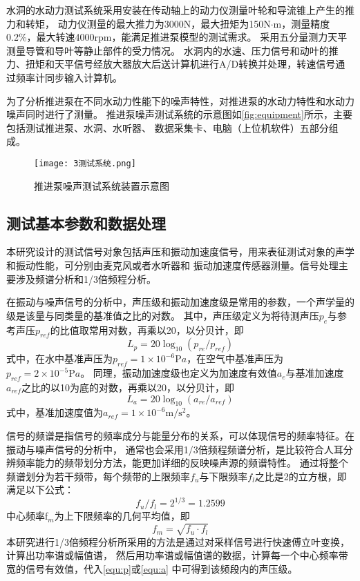 水洞的水动力测试系统采用安装在传动轴上的动力仪测量叶轮和导流锥上产生的推力和转矩，
动力仪测量的最大推力为3000N，最大扭矩为150N$\cdot$m，测量精度0.2\%，最大转速4000rpm，能满足推进泵模型的测试需求。
采用五分量测力天平测量导管和导叶等静止部件的受力情况。
水洞内的水速、压力信号和动叶的推力、扭矩和天平信号经放大器放大后送计算机进行A/D转换并处理，转速信号通过频率计同步输入计算机。

为了分析推进泵在不同水动力性能下的噪声特性，对推进泵的水动力特性和水动力噪声同时进行了测量。
推进泵噪声测试系统的示意图如\autoref{fig:equipment}所示，主要包括测试推进泵、水洞、水听器、
数据采集卡、电脑（上位机软件）五部分组成。
\begin{figure}[htbp]
    \centering
    \texttt{[image: 3测试系统.png]}
    \caption{\label{fig:equipment}推进泵噪声测试系统装置示意图}
\end{figure}

\subsection{测试基本参数和数据处理}
本研究设计的测试信号对象包括声压和振动加速度信号，用来表征测试对象的声学和振动性能，可分别由麦克风或者水听器和
振动加速度传感器测量。信号处理主要涉及频谱分析和1/3倍频程分析。

在振动与噪声信号的分析中，声压级和振动加速度级是常用的参数，一个声学量的级是该量与同类量的基准值之比的对数。
其中，声压级定义为将待测声压$p_e$与参考声压$p_{ref}$的比值取常用对数，再乘以20，以分贝计，即
\begin{equation}
    \label{equ:p}
    L_{p} = 20\log_{10}{\left(p_{re}/p_{ref}\right )}
\end{equation}
式中，在水中基准声压为$p_{ref}= 1\times 10^{-6} \mathrm{P} a$，在空气中基准声压为$p_{ref}= 2\times 10^{-5} \mathrm{P} a$。
同理，振动加速度级也定义为加速度有效值$a_e$与基准加速度$a_{ref}$之比的以10为底的对数，再乘以20，以分贝计，即
\begin{equation}
    \label{equ:a}
    L_{a} = 20\log_{10}{\left(a_{re}/a_{ref}\right )}
\end{equation}
式中，基准加速度值为$a_{ref}= 1\times 10^{-6} \mathrm{m/s^2} $。

信号的频谱是指信号的频率成分与能量分布的关系，可以体现信号的频率特征。在振动与噪声信号的分析中，
通常也会采用1/3倍频程频谱分析，是比较符合人耳分辨频率能力的频带划分方法，能更加详细的反映噪声源的频谱特性。
通过将整个频谱划分为若干频带，每个频带的上限频率$f_u$与下限频率$f_l$之比是2的立方根，即满足以下公式：
\begin{equation}
    \label{equ:fu}
    f_{u}/f_{l}=2^{1/3}=1.2599
\end{equation}
中心频率f$_{m}$为上下限频率的几何平均值，即
\begin{equation}
    \label{equ:fm}
    f_{m}=\sqrt{f_{u}\cdot f_{l} } 
\end{equation}
本研究进行1/3倍频程分析所采用的方法是通过对采样信号进行快速傅立叶变换，计算出功率谱或幅值谱，
然后用功率谱或幅值谱的数据，计算每一个中心频率带宽的信号有效值，代入\autoref{equ:p}或\autoref{equ:a}
中可得到该频段内的声压级。
